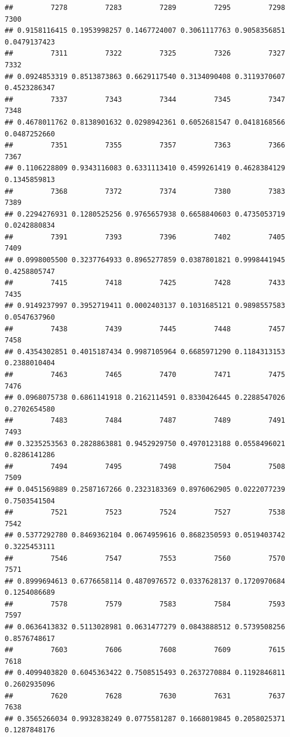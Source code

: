 \documentclass[
]{article}
\begin{document}
\begin{verbatim}
##         7278         7283         7289         7295         7298         7300 
## 0.9158116415 0.1953998257 0.1467724007 0.3061117763 0.9058356851 0.0479137423 
##         7311         7322         7325         7326         7327         7332 
## 0.0924853319 0.8513873863 0.6629117540 0.3134090408 0.3119370607 0.4523286347 
##         7337         7343         7344         7345         7347         7348 
## 0.4678011762 0.8138901632 0.0298942361 0.6052681547 0.0418168566 0.0487252660 
##         7351         7355         7357         7363         7366         7367 
## 0.1106228809 0.9343116083 0.6331113410 0.4599261419 0.4628384129 0.1345859813 
##         7368         7372         7374         7380         7383         7389 
## 0.2294276931 0.1280525256 0.9765657938 0.6658840603 0.4735053719 0.0242880834 
##         7391         7393         7396         7402         7405         7409 
## 0.0998005500 0.3237764933 0.8965277859 0.0387801821 0.9998441945 0.4258805747 
##         7415         7418         7425         7428         7433         7435 
## 0.9149237997 0.3952719411 0.0002403137 0.1031685121 0.9898557583 0.0547637960 
##         7438         7439         7445         7448         7457         7458 
## 0.4354302851 0.4015187434 0.9987105964 0.6685971290 0.1184313153 0.2388010404 
##         7463         7465         7470         7471         7475         7476 
## 0.0968075738 0.6861141918 0.2162114591 0.8330426445 0.2288547026 0.2702654580 
##         7483         7484         7487         7489         7491         7493 
## 0.3235253563 0.2828863881 0.9452929750 0.4970123188 0.0558496021 0.8286141286 
##         7494         7495         7498         7504         7508         7509 
## 0.0451569889 0.2587167266 0.2323183369 0.8976062905 0.0222077239 0.7503541504 
##         7521         7523         7524         7527         7538         7542 
## 0.5377292780 0.8469362104 0.0674959616 0.8682350593 0.0519403742 0.3225453111 
##         7546         7547         7553         7560         7570         7571 
## 0.8999694613 0.6776658114 0.4870976572 0.0337628137 0.1720970684 0.1254086689 
##         7578         7579         7583         7584         7593         7597 
## 0.0636413832 0.5113028981 0.0631477279 0.0843888512 0.5739508256 0.8576748617 
##         7603         7606         7608         7609         7615         7618 
## 0.4099403820 0.6045363422 0.7508515493 0.2637270884 0.1192846811 0.2602935096 
##         7620         7628         7630         7631         7637         7638 
## 0.3565266034 0.9932838249 0.0775581287 0.1668019845 0.2058025371 0.1287848176 

\end{verbatim}
\end{document}
